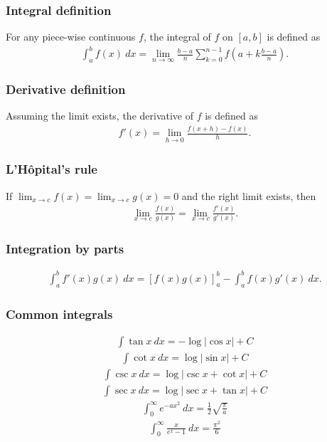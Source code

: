 \subsubsection{Integral definition}
For any piece-wise continuous $f$, the integral of $f$ on $[a, b]$ is defined as
\begin{align*}
    \int_a^b f(x)\ dx = \lim_{n \to \infty} \frac{b - a}n \sum_{k=0}^{n-1} f\left(a + k\frac{b - a}n\right).
\end{align*}

\subsubsection{Derivative definition}
Assuming the limit exists, the derivative of $f$ is defined as
\begin{align*}
    f'(x) = \lim_{h \to 0} \frac{f(x + h) - f(x)}h.
\end{align*}

\subsubsection{L'Hôpital's rule}
If $\lim_{x\to c} f(x) = \lim_{x \to c} g(x) = 0$ and the right limit exists, then
\begin{align*}
    \lim_{x \to c} \frac{f(x)}{g(x)} = \lim_{x \to c} \frac{f'(x)}{g'(x)}.
\end{align*}

\subsubsection{Integration by parts}
\begin{align*}
    \int_a^b f'(x)g(x)\ dx = \left[f(x)g(x)\right]_a^b - \int_a^b f(x)g'(x)\ dx.
\end{align*}

\subsubsection{Common integrals}
\begin{align*}
    \int \tan x\ dx = -\log|\cos x| + C
\end{align*}
\begin{align*}
    \int \cot x\ dx = \log|\sin x| + C
\end{align*}
\begin{align*}
    \int \csc x\ dx = \log|\csc x + \cot x| + C
\end{align*}
\begin{align*}
    \int \sec x\ dx = \log|\sec x + \tan x| + C
\end{align*}
\begin{align*}
    \int_0^\infty e^{-ax^2}\ dx = \frac12\sqrt{\frac \pi a}
\end{align*}
\begin{align*}
    \int_0^\infty \frac x{e^x - 1}\ dx = \frac{\pi^2}6
\end{align*}

